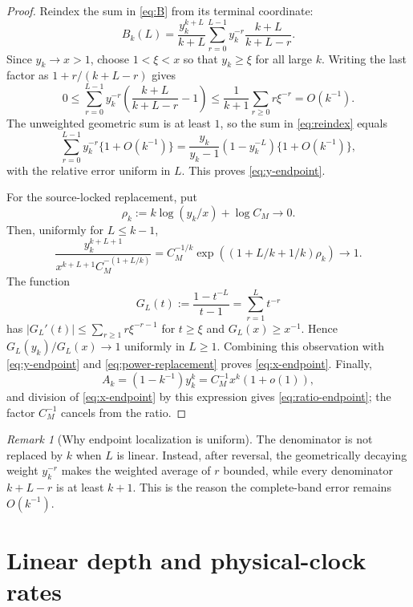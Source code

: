 \documentclass[11pt]{article}
\theoremstyle{remark}
\newtheorem{remark}[theorem]{Remark}
\begin{document}
\begin{proof}
Reindex the sum in \eqref{eq:B} from its terminal coordinate:
\begin{equation}\label{eq:reindex}
 B_k(L)=\frac{y_k^{k+L}}{k+L}
 \sum_{r=0}^{L-1}y_k^{-r}\frac{k+L}{k+L-r}.
\end{equation}
Since $y_k\to x>1$, choose $1<\xi<x$ so that $y_k\ge\xi$ for all large $k$.
Writing the last factor as $1+r/(k+L-r)$ gives
\[
 0\le\sum_{r=0}^{L-1}y_k^{-r}
 \left(\frac{k+L}{k+L-r}-1\right)
 \le\frac1{k+1}\sum_{r\ge0}r\xi^{-r}=O(k^{-1}).
\]
The unweighted geometric sum is at least $1$, so the sum in
\eqref{eq:reindex} equals
\[
 \sum_{r=0}^{L-1}y_k^{-r}\{1+O(k^{-1})\}
 =\frac{y_k}{y_k-1}(1-y_k^{-L})\{1+O(k^{-1})\},
\]
with the relative error uniform in $L$.  This proves \eqref{eq:y-endpoint}.

For the source-locked replacement, put
\[
 \rho_k:=k\log(y_k/x)+\log C_M\longrightarrow0.
\]
Then, uniformly for $L\le k-1$,
\begin{equation}\label{eq:power-replacement}
 \frac{y_k^{k+L+1}}
 {x^{k+L+1}C_M^{-(1+L/k)}}
 =C_M^{-1/k}\exp\left((1+L/k+1/k)\rho_k\right)\longrightarrow1.
\end{equation}
The function
\[
 G_L(t):=\frac{1-t^{-L}}{t-1}=\sum_{r=1}^{L}t^{-r}
\]
has $|G_L'(t)|\le\sum_{r\ge1}r\xi^{-r-1}$ for $t\ge\xi$ and
$G_L(x)\ge x^{-1}$.  Hence $G_L(y_k)/G_L(x)\to1$ uniformly in
$L\ge1$.  Combining this observation with \eqref{eq:y-endpoint} and
\eqref{eq:power-replacement} proves \eqref{eq:x-endpoint}.  Finally,
\[
 A_k=(1-k^{-1})y_k^k=C_M^{-1}x^k(1+o(1)),
\]
and division of \eqref{eq:x-endpoint} by this expression gives
\eqref{eq:ratio-endpoint}; the factor $C_M^{-1}$ cancels from the ratio.
\end{proof}

\begin{remark}[Why endpoint localization is uniform]
The denominator is not replaced by $k$ when $L$ is linear.  Instead, after
reversal, the geometrically decaying weight $y_k^{-r}$ makes the weighted
average of $r$ bounded, while every denominator $k+L-r$ is at least $k+1$.
This is the reason the complete-band error remains $O(k^{-1})$.
\end{remark}

\section{Linear depth and physical-clock rates}
\end{document}
